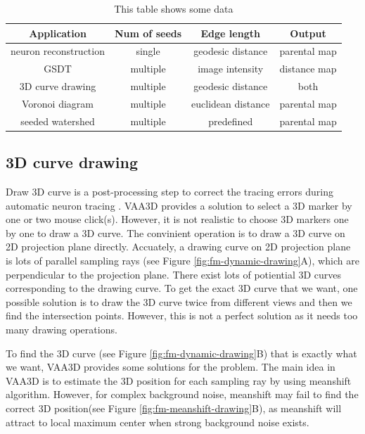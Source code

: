 \begin{table}
\begin{center}
\begin{tabular}{ | c | c | c | c |}
    \hline
    \textbf{Application} & \textbf{Num of seeds} & \textbf{Edge length} & \textbf{Output} \\ \hline
    neuron reconstruction & single & geodesic distance & parental map \\ \hline
    GSDT & multiple & image intensity & distance map  \\ \hline
    3D curve drawing & multiple & geodesic distance & both \\ \hline
    Voronoi diagram & multiple & euclidean distance & parental map  \\ \hline
    seeded watershed & multiple & predefined & parental map \\ \hline
  \end{tabular}
\end{center}
\caption{This table shows some data}
\label{tab:fm-app}
\end{table}

\subsection{3D curve drawing}
\label{sect:fm-3dcurve}
Draw 3D curve is a post-processing step to correct the tracing errors during automatic neuron tracing \cite{peng2011automatic, Xiao:2011}. VAA3D \cite{peng2010v3d} provides a solution to select a 3D marker by one or two mouse click(s). However, it is not realistic to choose 3D markers one by one to draw a 3D curve. The convinient operation is to draw a 3D curve on 2D projection plane directly. Accuately, a drawing curve on 2D projection plane is lots of parallel sampling rays (see Figure \ref{fig:fm-dynamic-drawing}A), which are perpendicular to the projection plane. There exist lots of potiential 3D curves corresponding to the drawing curve. To get the exact 3D curve that we want, one possible solution is to draw the 3D curve twice from different views and then we find the intersection points. However, this is not a perfect solution as it needs too many drawing operations.

To find the 3D curve (see Figure \ref{fig:fm-dynamic-drawing}B) that is exactly what we want,  VAA3D provides some solutions for the problem. The main idea in VAA3D is to estimate the 3D position for each sampling ray by using meanshift \cite{comaniciu2002mean} algorithm. However, for complex background noise, meanshift may fail to find the correct 3D position(see Figure \ref{fig:fm-meanshift-drawing}B), as meanshift will attract to local maximum center when strong background noise exists. 


